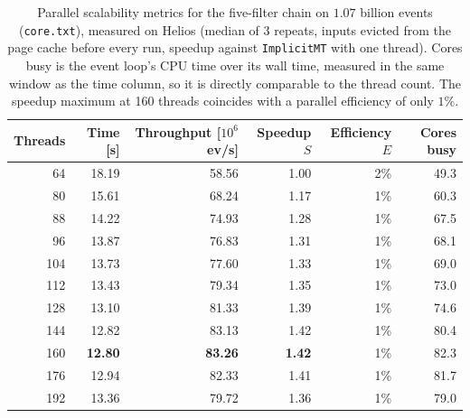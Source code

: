 \begin{table}[htbp]
\centering
\caption{Parallel scalability metrics for the five-filter chain on $1.07$ billion events (\texttt{core.txt}), measured on Helios (median of 3 repeats, inputs evicted from the page cache before every run, speedup against \texttt{ImplicitMT} with one thread). Cores busy is the event loop's CPU time over its wall time, measured in the same window as the time column, so it is directly comparable to the thread count. The speedup maximum at 160 threads coincides with a parallel efficiency of only $1\%$.}
\label{tab:scalability-chain}
\begin{tabular}{rrrrrr}
\toprule
Threads & Time [s] & Throughput [$10^6$ ev/s] & Speedup $S$ & Efficiency $E$ & Cores busy \\
\midrule
64 & 18.19 & 58.56 & 1.00 & 2\% & 49.3 \\
80 & 15.61 & 68.24 & 1.17 & 1\% & 60.3 \\
88 & 14.22 & 74.93 & 1.28 & 1\% & 67.5 \\
96 & 13.87 & 76.83 & 1.31 & 1\% & 68.1 \\
104 & 13.73 & 77.60 & 1.33 & 1\% & 69.0 \\
112 & 13.43 & 79.34 & 1.35 & 1\% & 73.0 \\
128 & 13.10 & 81.33 & 1.39 & 1\% & 74.6 \\
144 & 12.82 & 83.13 & 1.42 & 1\% & 80.4 \\
160 & \textbf{12.80} & \textbf{83.26} & \textbf{1.42} & 1\% & 82.3 \\
176 & 12.94 & 82.33 & 1.41 & 1\% & 81.7 \\
192 & 13.36 & 79.72 & 1.36 & 1\% & 79.0 \\
\bottomrule
\end{tabular}
\end{table}
